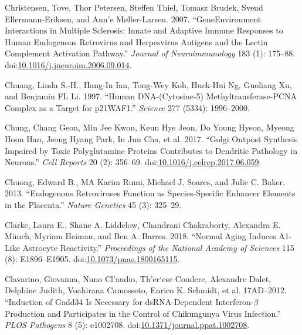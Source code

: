 \documentclass[onehalf,12pt]{beavtex}
\begin{document}
  \hypertarget{ref-ChristensenGeneenvironmentinteractions2007a}{}
  Christensen, Tove, Thor Petersen, Steffen Thiel, Tomasz Brudek, Svend
  Ellermann-Eriksen, and Ann\a'e Møller-Larsen. 2007. ``GeneEnvironment
  Interactions in Multiple Sclerosis: Innate and Adaptive Immune Responses
  to Human Endogenous Retrovirus and Herpesvirus Antigens and the Lectin
  Complement Activation Pathway.'' \emph{Journal of Neuroimmunology} 183
  (1): 175--88.
  doi:\href{https://doi.org/10.1016/j.jneuroim.2006.09.014}{10.1016/j.jneuroim.2006.09.014}.
  
  \hypertarget{ref-ChuangHumanDNAcytosine51997}{}
  Chuang, Linda S.-H., Hang-In Ian, Tong-Wey Koh, Huck-Hui Ng, Guoliang
  Xu, and Benjamin FL Li. 1997. ``Human DNA-(Cytosine-5)
  Methyltransferase-PCNA Complex as a Target for p21WAF1.'' \emph{Science}
  277 (5334): 1996--2000.
  
  \hypertarget{ref-ChungGolgiOutpostSynthesis2017}{}
  Chung, Chang Geon, Min Jee Kwon, Keun Hye Jeon, Do Young Hyeon, Myeong
  Hoon Han, Jeong Hyang Park, In Jun Cha, et al. 2017. ``Golgi Outpost
  Synthesis Impaired by Toxic Polyglutamine Proteins Contributes to
  Dendritic Pathology in Neurons.'' \emph{Cell Reports} 20 (2): 356--69.
  doi:\href{https://doi.org/10.1016/j.celrep.2017.06.059}{10.1016/j.celrep.2017.06.059}.
  
  \hypertarget{ref-ChuongEndogenousretrovirusesfunction2013}{}
  Chuong, Edward B., MA Karim Rumi, Michael J. Soares, and Julie C. Baker.
  2013. ``Endogenous Retroviruses Function as Species-Specific Enhancer
  Elements in the Placenta.'' \emph{Nature Genetics} 45 (3): 325--29.
  
  \hypertarget{ref-ClarkeNormalaginginduces2018}{}
  Clarke, Laura E., Shane A. Liddelow, Chandrani Chakraborty, Alexandra E.
  Münch, Myriam Heiman, and Ben A. Barres. 2018. ``Normal Aging Induces
  A1-Like Astrocyte Reactivity.'' \emph{Proceedings of the National
  Academy of Sciences} 115 (8): E1896--E1905.
  doi:\href{https://doi.org/10.1073/pnas.1800165115}{10.1073/pnas.1800165115}.
  
  \hypertarget{ref-ClavarinoInductionGADD34Necessary2012}{}
  Clavarino, Giovanna, Nuno Cl\a'audio, Th\a'er\a`ese Couderc, Alexandre
  Dalet, Delphine Judith, Voahirana Camosseto, Enrico K. Schmidt, et al.
  17AD--2012. ``Induction of Gadd34 Is Necessary for dsRNA-Dependent
  Interferon-\(\beta\) Production and Participates in the Control of
  Chikungunya Virus Infection.'' \emph{PLOS Pathogens} 8 (5): e1002708.
  doi:\href{https://doi.org/10.1371/journal.ppat.1002708}{10.1371/journal.ppat.1002708}.
  
\end{document}
